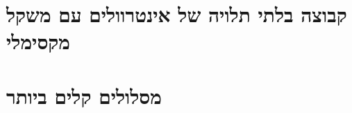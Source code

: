 \documentclass[]{article}
\def\insert#1{}
\begin{document}
\def\lecnum{9}
\def\topcis{
תכנון דינאמי
}


\section*{קבוצה בלתי תלויה של אינטרוולים עם משקל מקסימלי}
\insert{interval}

\section*{מסלולים קלים ביותר}
\insert{path}
\end{document}
